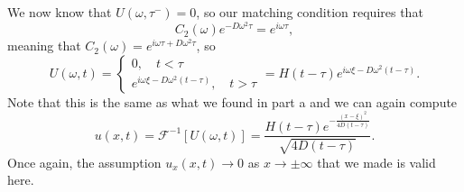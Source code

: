 \documentclass{article}
\begin{document}
We now know that $U(\omega,\tau^-)=0$, so our matching condition requires that 
\[
C_2(\omega)e^{-D\omega^2\tau}=e^{i\omega\tau},
\]
meaning that $C_2(\omega)=e^{i\omega\tau+D\omega^2\tau}$,
so 
\[
U(\omega,t)=\begin{cases}
	0,\quad t<\tau\\
	e^{i\omega \xi-D\omega^2(t-\tau)},\quad t>\tau
\end{cases}=H(t-\tau)e^{i\omega \xi-D\omega^2(t-\tau)}.
\]
Note that this is the same as what we found in part a and we can again compute
\[
u(x,t)=\mathcal{F}^{-1}[U(\omega,t)]=\frac{H(t-\tau)e^{-\frac{(x-\xi)^2}{4D(t-\tau)}}}{\sqrt{4D(t-\tau)}}.
\]
Once again, the assumption $u_x(x,t)\to0$ as $x\to\pm\infty$ that we made is valid here. 
\end{document}
